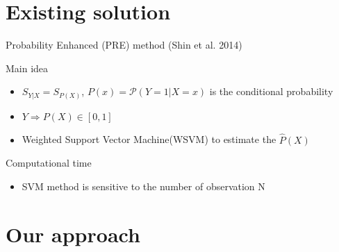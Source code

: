 \documentclass[ignorenonframetext,]{beamer}
\providecommand{\tightlist}{%
  \setlength{\itemsep}{0pt}\setlength{\parskip}{0pt}}
\begin{document}
\section{Existing solution}\label{existing-solution}

\begin{frame}{Probability Enhanced (PRE) method (Shin et al. 2014)}

\begin{block}{Main idea}

\begin{itemize}
\tightlist
\item
  \(S_{Y|X} = S_{P(X)}\), \(P(x) = \mathcal{P}(Y = 1|X = x)\) is the
  conditional probability
\item
  \(Y \Rightarrow P(X) \in [0,1]\)
\item
  Weighted Support Vector Machine(WSVM) to estimate the \(\hat{P}(X)\)
\end{itemize}

\end{block}

\begin{block}{Computational time}

\begin{itemize}
\tightlist
\item
  SVM method is sensitive to the number of observation N
\end{itemize}

\end{block}

\end{frame}

\section{Our approach}\label{our-approach}
\end{document}
